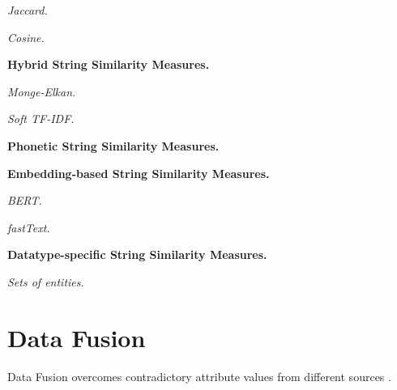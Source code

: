 
\textit{Jaccard.}

\textit{Cosine.}

\textbf{Hybrid String Similarity Measures.}

\textit{Monge-Elkan.}

\textit{Soft TF-IDF.}

\textbf{Phonetic String Similarity Measures.}

\textbf{Embedding-based String Similarity Measures.}

\textit{BERT.}

\textit{fastText.}

\textbf{Datatype-specific String Similarity Measures.}

\textit{Sets of entities.}

\section{Data Fusion}

Data Fusion overcomes contradictory attribute values from different sources \cite{Bleiholder2009DataF}.